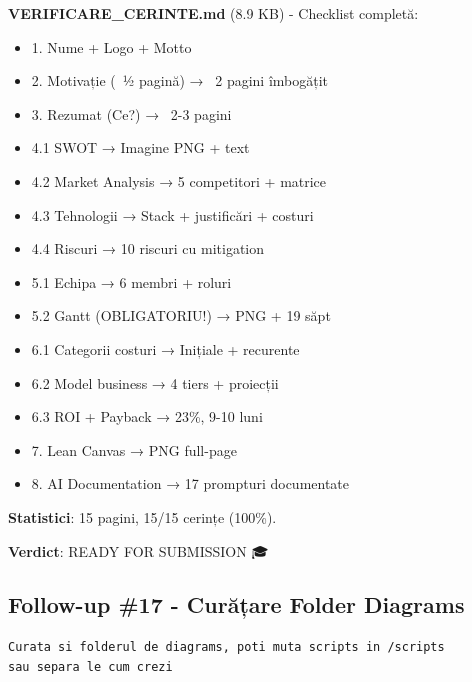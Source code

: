 \documentclass[11pt,a4paper]{article}
\begin{document}
\begin{tcolorbox}[colback=outputbackground,colframe=green!75!black,title=Output Generat]
\textbf{VERIFICARE\_CERINTE.md} (8.9 KB) - Checklist completă:
\begin{itemize}[leftmargin=*]
    \item [✅] 1. Nume + Logo + Motto
    \item [✅] 2. Motivație (~½ pagină) → ~2 pagini îmbogățit
    \item [✅] 3. Rezumat (Ce?) → ~2-3 pagini
    \item [✅] 4.1 SWOT → Imagine PNG + text
    \item [✅] 4.2 Market Analysis → 5 competitori + matrice
    \item [✅] 4.3 Tehnologii → Stack + justificări + costuri
    \item [✅] 4.4 Riscuri → 10 riscuri cu mitigation
    \item [✅] 5.1 Echipa → 6 membri + roluri
    \item [✅] 5.2 Gantt (OBLIGATORIU!) → PNG + 19 săpt
    \item [✅] 6.1 Categorii costuri → Inițiale + recurente
    \item [✅] 6.2 Model business → 4 tiers + proiecții
    \item [✅] 6.3 ROI + Payback → 23\%, 9-10 luni
    \item [✅] 7. Lean Canvas → PNG full-page
    \item [✅] 8. AI Documentation → 17 prompturi documentate
\end{itemize}

\textbf{Statistici}: 15 pagini, 15/15 cerințe (100\%).

\textbf{Verdict}: READY FOR SUBMISSION 🎓
\end{tcolorbox}

\subsection{Follow-up \#17 - Curățare Folder Diagrams}

\begin{tcolorbox}[colback=promptbackground,colframe=blue!75!black,title=Prompt Input]
\begin{verbatim}
Curata si folderul de diagrams, poti muta scripts in /scripts
sau separa le cum crezi
\end{verbatim}
\end{tcolorbox}
\end{document}
